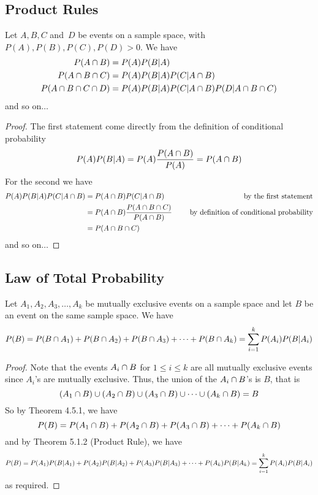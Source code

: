 \subsection*{Product Rules}
\begin{theorem}
Let $A, B, C$ and~$D$ be events on a sample space, with $P(A), P(B), P(C), P(D) > 0$. We have
\begin{align*}
    P(A \cap B) &= P(A)P(B \vert A) \\
    P(A \cap B \cap C) &= P(A)P(B \vert A)P(C \vert A \cap B) \\
    P(A \cap B \cap C \cap D) &=
    P(A)P(B \vert A)P(C \vert A \cap B)P(D \vert A \cap B \cap C) \\
\end{align*}
and so on$\ldots$
\end{theorem}
\begin{proof}
The first statement come directly from the definition of conditional probability
\[
    P(A)P(B \vert A) = P(A) \frac{P(A \cap B)}{P(A)} = P(A \cap B)
\]
For the second we have
\begin{align*}
    P(A)P(B \vert A)P(C \vert A \cap B)
    &= P(A \cap B)P(C \vert A \cap B)
    &\hspace{5mm}\text{by the first statement} \\
    &= P(A \cap B) \frac{P(A \cap B \cap C)}{P(A \cap B)}
    &\hspace{5mm}\text{by definition of conditional probability} \\
    &= P(A \cap B \cap C)
\end{align*}
and so on$\ldots$
\end{proof}
\subsection*{Law of Total Probability}
\begin{theorem}
Let $A_1, A_2, A_3,\ldots,A_k$ be mutually exclusive events on a sample space and let $B$ be an event on the same sample space. We have
\[
    P(B) = P(B \cap A_1) + P(B \cap A_2) + P(B \cap A_3) + \cdots + P(B \cap A_k)
    = \sum_{i = 1}^{k} P(A_i)P(B \vert A_i)
\]
\end{theorem}
\begin{proof}
Note that the events $A_i \cap B$ for $1 \leq i \leq k$ are all mutually exclusive events since $A_i$'s are mutually exclusive. Thus, the union of the $A_i \cap B$'s is $B$, that is 
\[
    (A_1 \cap B) \cup (A_2 \cap B) \cup (A_3 \cap B) \cup \cdots \cup (A_k \cap B) = B
\]
So by Theorem 4.5.1, we have
\[
    P(B) = P(A_1 \cap B) + P(A_2 \cap B) + P(A_3 \cap B) + \cdots + P(A_k \cap B)
\]
and by Theorem 5.1.2 (Product Rule), we have
\[
    P(B) = P(A_1)P(B \vert A_1) + P(A_2)P(B \vert A_2) + P(A_3)P(B \vert A_3) + \cdots + P(A_k)P(B \vert A_k) = \sum_{i = 1}^{k} P(A_i)P(B \vert A_i)
\]
as required.
\end{proof}
